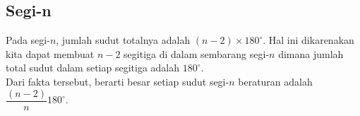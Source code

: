 \subsection{Segi-n}
Pada segi-$n$, jumlah sudut totalnya adalah $(n-2)\times 180^\circ$. Hal ini dikarenakan kita dapat membuat $n-2$ segitiga di dalam sembarang segi-$n$ dimana jumlah total sudut dalam setiap segitiga adalah $180^\circ$.\\

Dari fakta tersebut, berarti besar setiap sudut segi-$n$ beraturan adalah $\dfrac{(n-2)}{n}180^\circ$.

